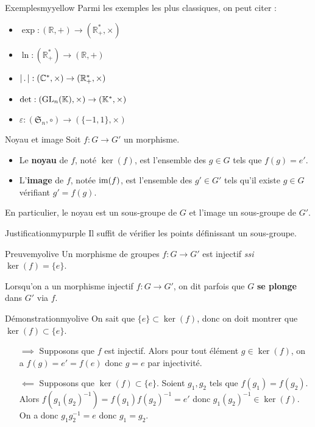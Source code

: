     \begin{omed}{Exemples}{myyellow}
        Parmi les exemples les plus classiques, on peut citer :
        \begin{itemize}
            \item $\exp : (\mathbb{R}, +) \to (\mathbb{R}_+^*, \times)$
            \item $\ln : (\mathbb{R}_+^*) \to (\mathbb{R},+)$
            \item $\left\lvert \,. \, \right\rvert : (\mathbb{C}^*, \times) \to (\mathbb{R}_+^*, \times)$
            \item $\det : (\operatorname{GL}_n(\mathbb{K}), \times) \to (\mathbb{K}^*, \times)$
            \item $\varepsilon : (\mathfrak{S}_n, \circ) \to (\{-1,1\}, \times)$
        \end{itemize}
    \end{omed}

    \begin{defitheo}{Noyau et image}{}
        Soit $f : G \to G'$ un morphisme.
        \begin{itemize}
            \item Le \textbf{noyau} de $f$, noté $\ker(f)$, est l’ensemble des $g \in G$ tels que $f(g) = e'$.
            \item L’\textbf{image} de $f$, notée $\operatorname{im}(f)$, est l’ensemble des $g' \in G'$ tels qu’il existe $g \in G$ vérifiant $g' = f(g)$.
        \end{itemize}
        En particulier, le noyau est un sous-groupe de $G$ et l’image un sous-groupe de $G'$.
    \end{defitheo}

    \begin{demo}{Justification}{mypurple}
        Il suffit de vérifier les points définissant un sous-groupe.
    \end{demo}

    \begin{prop}{Preuve}{myolive}
        Un morphisme de groupes $f : G \to G'$ est injectif \textit{ssi} $\ker(f) = \{e\}$.
    \end{prop}

    Lorsqu’on a un morphisme injectif $f : G \to G'$, on dit parfois que $G$ \textbf{se plonge} dans $G'$ via $f$.

    \begin{demo}{Démonstration}{myolive}
        On sait que $\{e\} \subset \ker(f)$, donc on doit montrer que $\ker(f) \subset \{e\}$.
        \begin{itemize}
            \item[$\implies$] Supposons que $f$ est injectif. Alors pour tout élément $g \in \ker(f)$, on a $f(g) = e' = f(e)$ donc $g = e$ par injectivité.
            \item[$\impliedby$] Supposons que $\ker(f) \subset \{e\}$. Soient $g_1,g_2$ tels que $f(g_1) = f(g_2)$. Alors $f\left(g_1 (g_2)^{-1}\right) = f(g_1)f(g_2)^{-1} = e'$ donc $g_1 (g_2)^{-1}  \in \ker(f)$. On a donc $g_1 g_2^{-1} = e$ donc $g_1 = g_2$.
        \end{itemize}
    \end{demo}

